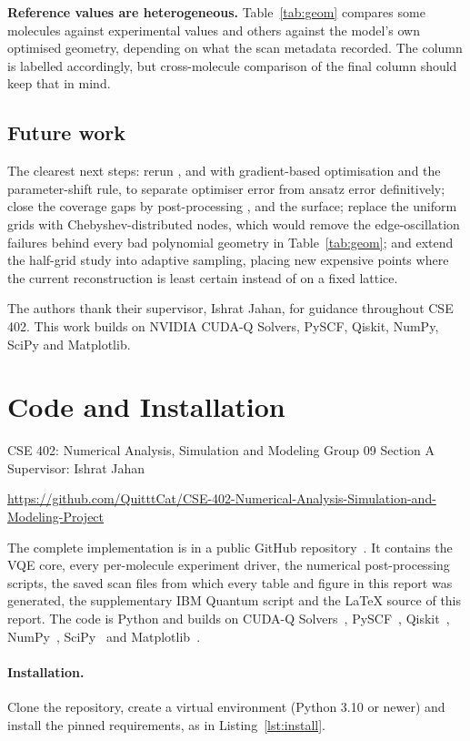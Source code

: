 \documentclass[sigconf,screen,nonacm]{acmart}
\makeatletter
\newcommand{\@resetcolroom}{%
  \ifdim\pagetotal=\z@
    \ifx\@toplist\@empty\ifx\@botlist\@empty\ifx\@midlist\@empty
      \global\@colroom\@colht
      \global\vsize\@colht
    \fi\fi\fi
  \fi}
\let\@origFloatBarrier\FloatBarrier
\renewcommand{\FloatBarrier}{\@origFloatBarrier\@resetcolroom}
\newcommand{\BannerCourse}{CSE 402: Numerical Analysis, Simulation and Modeling \textbullet{} Group 09 \textbullet{} Section A \textbullet{} Supervisor: Ishrat Jahan}
\newcommand{\BannerGitHub}{\href{https://github.com/QuitttCat/CSE-402-Numerical-Analysis-Simulation-and-Modeling-Project}{\faGithub\hspace{0.3em}https://github.com/QuitttCat/CSE-402-Numerical-Analysis-Simulation-and-Modeling-Project}}
\newcommand{\ProjectBanner}{{\centering\small\BannerCourse\par\smallskip\BannerGitHub\par}}
\makeatother
\begin{document}
\textbf{Reference values are heterogeneous.} Table~\ref{tab:geom} compares
some molecules against experimental values and others against the model's
own optimised geometry, depending on what the scan metadata recorded. The
column is labelled accordingly, but cross-molecule comparison of the final
column should keep that in mind.

\subsection{Future work}
The clearest next steps: rerun ,  and  with
gradient-based optimisation and the parameter-shift rule, to separate
optimiser error from ansatz error definitively; close the coverage gaps by
post-processing ,  and the  surface; replace the
uniform grids with Chebyshev-distributed nodes, which would remove the
edge-oscillation failures behind every bad polynomial geometry in
Table~\ref{tab:geom}; and extend the half-grid study into adaptive sampling,
placing new expensive points where the current reconstruction is least
certain instead of on a fixed lattice.

\begin{acks}
The authors thank their supervisor, Ishrat Jahan, for guidance throughout
CSE 402. This work builds on NVIDIA CUDA-Q Solvers, PySCF, Qiskit, NumPy,
SciPy and Matplotlib.
\end{acks}

\FloatBarrier
\section{Code and Installation}
\label{sec:code}

\ProjectBanner
\medskip

The complete implementation is in a public GitHub repository~\cite{projectrepo}.
It contains the VQE core, every per-molecule experiment driver, the numerical
post-processing scripts, the saved scan files from which every table and
figure in this report was generated, the supplementary IBM Quantum script and
the LaTeX source of this report. The code is Python and builds on CUDA-Q
Solvers~\cite{cudaq}, PySCF~\cite{pyscf}, Qiskit~\cite{qiskit},
NumPy~\cite{numpy}, SciPy~\cite{scipy} and Matplotlib~\cite{matplotlib}.

\paragraph{Installation.}
Clone the repository, create a virtual environment (Python 3.10 or newer) and
install the pinned requirements, as in Listing~\ref{lst:install}.
\end{document}
